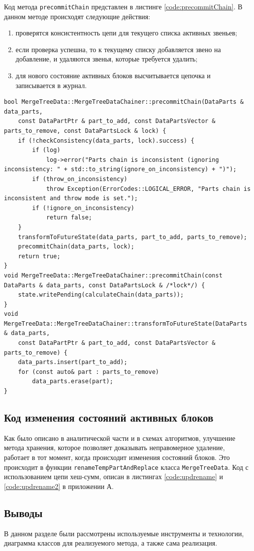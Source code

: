 Код метода \texttt{precommitChain} представлен в листинге \ref{code:precommitChain}. В данном методе происходят следующие действия:
\begin{enumerate}
    \item проверятся консистентность цепи для текущего списка активных звеньев;
    \item если проверка успешна, то к текущему списку добавляется звено на добавление, и удаляются звенья, которые требуется удалить;
    \item для нового состояние активных блоков высчитывается цепочка и записывается в журнал.
\end{enumerate}

\pagebreak

\begin{lstlisting}[label=code:precommitChain, caption={Метод \texttt{precommitChain}.}]
bool MergeTreeData::MergeTreeDataChainer::precommitChain(DataParts & data_parts,
    const DataPartPtr & part_to_add, const DataPartsVector & parts_to_remove, const DataPartsLock & lock) {
    if (!checkConsistency(data_parts, lock).success) {
        if (log)
            log->error("Parts chain is inconsistent (ignoring inconsistency: " + std::to_string(ignore_on_inconsistency) + ")");
        if (throw_on_inconsistency)
            throw Exception(ErrorCodes::LOGICAL_ERROR, "Parts chain is inconsistent and throw mode is set.");
        if (!ignore_on_inconsistency)
            return false;
    }
    transformToFutureState(data_parts, part_to_add, parts_to_remove);
    precommitChain(data_parts, lock);
    return true;
}
void MergeTreeData::MergeTreeDataChainer::precommitChain(const DataParts & data_parts, const DataPartsLock & /*lock*/) {
    state.writePending(calculateChain(data_parts));
}
void MergeTreeData::MergeTreeDataChainer::transformToFutureState(DataParts & data_parts,
    const DataPartPtr & part_to_add, const DataPartsVector & parts_to_remove) {
    data_parts.insert(part_to_add);
    for (const auto& part : parts_to_remove)
        data_parts.erase(part);
}
\end{lstlisting}

\subsection{Код изменения состояний активных блоков}

Как было описано в аналитической части и в схемах алгоритмов, улучшение метода хранения, которое позволяет доказывать неправомерное удаление, работает в тот момент, когда происходит изменения состояний блоков. Это происходит в функции \texttt{renameTempPartAndReplace} класса \texttt{MergeTreeData}. Код с использованием цепи хеш-сумм, описан в листингах \ref{code:updrename} и \ref{code:updrename2} в приложении А.

\subsection{Выводы}

В данном разделе были рассмотрены используемые инструменты и технологии, диаграмма классов для реализуемого метода, а также сама реализация.

\pagebreak